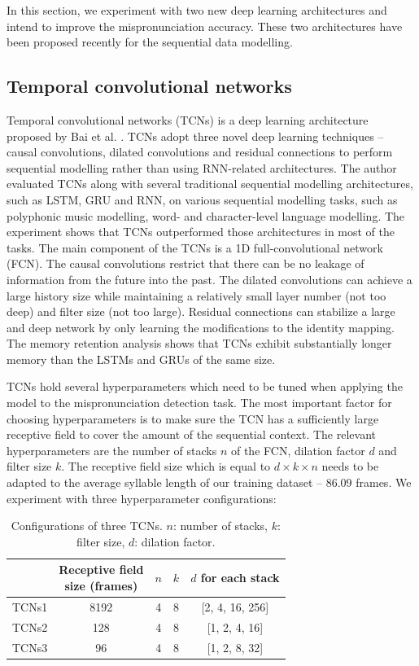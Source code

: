In this section, we experiment with two new deep learning architectures and intend to improve the mispronunciation accuracy. These two architectures have been proposed recently for the sequential data modelling.

\subsection{Temporal convolutional networks}

Temporal convolutional networks (TCNs) is a deep learning architecture proposed by Bai et al. \cite{Bai2018}. TCNs adopt three novel deep learning techniques -- causal convolutions, dilated convolutions and residual connections to perform sequential modelling rather than using RNN-related architectures. The author evaluated TCNs along with several traditional sequential modelling architectures, such as LSTM, GRU and RNN, on various sequential modelling tasks, such as polyphonic music modelling, word- and character-level language modelling. The experiment shows that TCNs outperformed those architectures in most of the tasks. The main component of the TCNs is a 1D full-convolutional network (FCN). The causal convolutions restrict that there can be no leakage of information from the future into the past. The dilated convolutions can achieve a large history size while maintaining a relatively small layer number (not too deep) and filter size (not too large). Residual connections can stabilize a large and deep network by only learning the modifications to the identity mapping. The memory retention analysis shows that TCNs exhibit substantially longer memory than the LSTMs and GRUs of the same size.

TCNs hold several hyperparameters which need to be tuned when applying the model to the mispronunciation detection task. The most important factor for choosing hyperparameters is to make sure the TCN has a sufficiently large receptive field to cover the amount of the sequential context. The relevant hyperparameters are the number of stacks $n$ of the FCN, dilation factor $d$ and filter size $k$. The receptive field size which is equal to $d\times k \times n$ needs to be adapted to the average syllable length of our training dataset -- 86.09 frames. We experiment with three hyperparameter configurations:

\begin{table}[ht!]
\centering
\caption{Configurations of three TCNs. $n$: number of stacks, $k$: filter size, $d$: dilation factor.}
\label{tab:ch6:tcns_configurations}
\begin{tabular}{ccccc}
\toprule
& \makecell[c]{Receptive field\\size (frames)} & $n$ & $k$ & $d$ for each stack \\
\midrule
TCNs1 & 8192 & 4 & 8 & [2, 4, 16, 256] \\
TCNs2 & 128 & 4 & 8 & [1, 2, 4, 16] \\
TCNs3 & 96 & 4 & 8 & [1, 2, 8, 32] \\
\bottomrule
\end{tabular}
\end{table}

